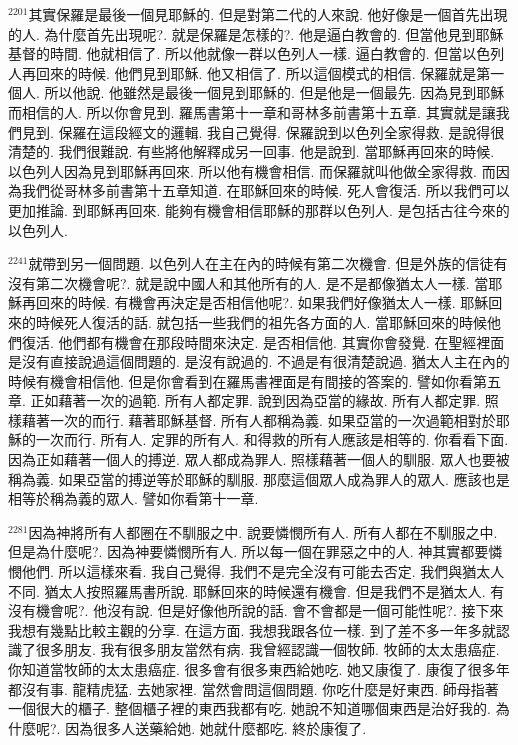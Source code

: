 \documentclass{book}
\begin{document}
$^{2201}$其實保羅是最後一個見耶穌的.
但是對第二代的人來說.
他好像是一個首先出現的人.
為什麼首先出現呢?.
就是保羅是怎樣的?.
他是逼白教會的.
但當他見到耶穌基督的時間.
他就相信了.
所以他就像一群以色列人一樣.
逼白教會的.
但當以色列人再回來的時候.
他們見到耶穌.
他又相信了.
所以這個模式的相信.
保羅就是第一個人.
所以他說.
他雖然是最後一個見到耶穌的.
但是他是一個最先.
因為見到耶穌而相信的人.
所以你會見到.
羅馬書第十一章和哥林多前書第十五章.
其實就是讓我們見到.
保羅在這段經文的邏輯.
我自己覺得.
保羅說到以色列全家得救.
是說得很清楚的.
我們很難說.
有些將他解釋成另一回事.
他是說到.
當耶穌再回來的時候.
以色列人因為見到耶穌再回來.
所以他有機會相信.
而保羅就叫他做全家得救.
而因為我們從哥林多前書第十五章知道.
在耶穌回來的時候.
死人會復活.
所以我們可以更加推論.
到耶穌再回來.
能夠有機會相信耶穌的那群以色列人.
是包括古往今來的以色列人.

$^{2241}$就帶到另一個問題.
以色列人在主在內的時候有第二次機會.
但是外族的信徒有沒有第二次機會呢?.
就是說中國人和其他所有的人.
是不是都像猶太人一樣.
當耶穌再回來的時候.
有機會再決定是否相信他呢?.
如果我們好像猶太人一樣.
耶穌回來的時候死人復活的話.
就包括一些我們的祖先各方面的人.
當耶穌回來的時候他們復活.
他們都有機會在那段時間來決定.
是否相信他.
其實你會發覺.
在聖經裡面是沒有直接說過這個問題的.
是沒有說過的.
不過是有很清楚說過.
猶太人主在內的時候有機會相信他.
但是你會看到在羅馬書裡面是有間接的答案的.
譬如你看第五章.
正如藉著一次的過範.
所有人都定罪.
說到因為亞當的緣故.
所有人都定罪.
照樣藉著一次的而行.
藉著耶穌基督.
所有人都稱為義.
如果亞當的一次過範相對於耶穌的一次而行.
所有人.
定罪的所有人.
和得救的所有人應該是相等的.
你看看下面.
因為正如藉著一個人的搏逆.
眾人都成為罪人.
照樣藉著一個人的馴服.
眾人也要被稱為義.
如果亞當的搏逆等於耶穌的馴服.
那麼這個眾人成為罪人的眾人.
應該也是相等於稱為義的眾人.
譬如你看第十一章.

$^{2281}$因為神將所有人都圈在不馴服之中.
說要憐憫所有人.
所有人都在不馴服之中.
但是為什麼呢?.
因為神要憐憫所有人.
所以每一個在罪惡之中的人.
神其實都要憐憫他們.
所以這樣來看.
我自己覺得.
我們不是完全沒有可能去否定.
我們與猶太人不同.
猶太人按照羅馬書所說.
耶穌回來的時候還有機會.
但是我們不是猶太人.
有沒有機會呢?.
他沒有說.
但是好像他所說的話.
會不會都是一個可能性呢?.
接下來我想有幾點比較主觀的分享.
在這方面.
我想我跟各位一樣.
到了差不多一年多就認識了很多朋友.
我有很多朋友當然有病.
我曾經認識一個牧師.
牧師的太太患癌症.
你知道當牧師的太太患癌症.
很多會有很多東西給她吃.
她又康復了.
康復了很多年都沒有事.
龍精虎猛.
去她家裡.
當然會問這個問題.
你吃什麼是好東西.
師母指著一個很大的櫃子.
整個櫃子裡的東西我都有吃.
她說不知道哪個東西是治好我的.
為什麼呢?.
因為很多人送藥給她.
她就什麼都吃.
終於康復了.
\end{document}
